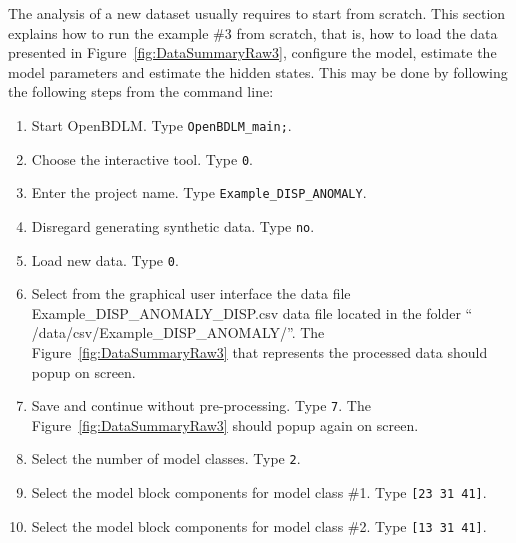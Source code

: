 The analysis of a new dataset usually requires to start from scratch.
This section explains how to run the example \#3 from scratch, that is, how to load the data presented in Figure~\ref{fig:DataSummaryRaw3}, configure the model, estimate the model parameters and estimate the hidden states.
This may be done by following the following steps from the \MATLAB{} command line:
\begin{enumerate}
\item Start OpenBDLM. Type \colorbox{light-gray}{\lstinline[basicstyle = \mlttfamily \small, backgroundcolor = \color{light-gray}]!OpenBDLM_main;!}.
\item Choose the interactive tool. Type \colorbox{light-gray}{\lstinline[basicstyle = \mlttfamily \small, backgroundcolor = \color{light-gray}]!0!}.
\item Enter the project name. Type \colorbox{light-gray}{\lstinline[basicstyle = \mlttfamily \small, backgroundcolor = \color{light-gray}]!Example_DISP_ANOMALY!}. 
\item Disregard generating synthetic data. Type \colorbox{light-gray}{\lstinline[basicstyle = \mlttfamily \small, backgroundcolor = \color{light-gray}]!no!}. 
\item Load new data. Type \colorbox{light-gray}{\lstinline[basicstyle = \mlttfamily \small, backgroundcolor = \color{light-gray}]!0!}.
\item Select from the graphical user interface the data file Example\_DISP\_ANOMALY\_DISP.csv data file located in the folder `` /data/csv/Example\_DISP\_ANOMALY/''. The Figure~\ref{fig:DataSummaryRaw3} that represents the processed data should popup on screen.
\item Save and continue without pre-processing. Type \colorbox{light-gray}{\lstinline[basicstyle = \mlttfamily \small, backgroundcolor = \color{light-gray}]!7!}. The Figure~\ref{fig:DataSummaryRaw3} should popup again on screen.
\item Select the number of model classes. Type \colorbox{light-gray}{\lstinline[basicstyle = \mlttfamily \small, backgroundcolor = \color{light-gray}]!2!}. 
\item Select the model block components for model class \#1. Type \colorbox{light-gray}{\lstinline[basicstyle = \mlttfamily \small, backgroundcolor = \color{light-gray}]![23 31 41]!}.
\item Select the model block components for model class \#2. Type \colorbox{light-gray}{\lstinline[basicstyle = \mlttfamily \small, backgroundcolor = \color{light-gray}]![13 31 41]!}.

\end{enumerate}
